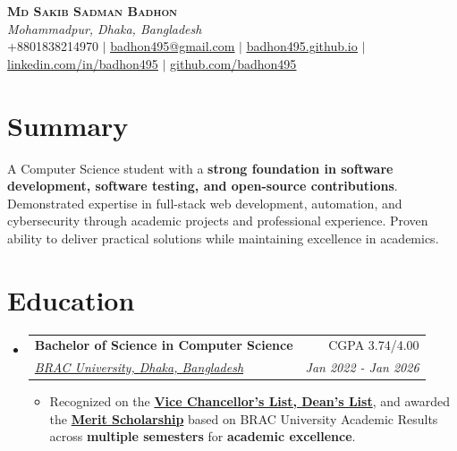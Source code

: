 \documentclass[letterpaper,11pt]{article}
\makeatletter
\newcommand{\resumeItem}[1]{
  \item\small{
    {#1 \vspace{-2pt}}
  }
}
\newcommand{\resumeSubheading}[4]{
  \vspace{-2pt}\item
    \begin{tabular*}{0.97\textwidth}[t]{l@{\extracolsep{\fill}}r}
      \textbf{#1} & #2 \\
      \textit{\small#3} & \textit{\small #4} \\
    \end{tabular*}\vspace{-7pt}
}
\newcommand{\resumeSubHeadingListStart}{\begin{itemize}[leftmargin=0.15in, label={}]}
\newcommand{\resumeSubHeadingListEnd}{\end{itemize}}
\newcommand{\resumeItemListStart}{\begin{itemize}}
\newcommand{\resumeItemListEnd}{\end{itemize}\vspace{-5pt}}
\makeatother
\begin{document}


\begin{center}
    \textbf{\Huge \scshape Md Sakib Sadman Badhon} \\ \vspace{1pt}
    \small \textit{Mohammadpur, Dhaka, Bangladesh} \\
    +8801838214970 $|$
    \href{mailto:badhon495@gmail.com}{\underline{badhon495@gmail.com}} $|$ 
    \href{https://badhon495.github.io/}{\underline{badhon495.github.io}} $|$ 
    \href{https://www.linkedin.com/in/badhon495/}{\underline{linkedin.com/in/badhon495}} $|$
    \href{https://github.com/badhon495}{\underline{github.com/badhon495}}
\end{center}

\section{Summary}
A Computer Science student with a \textbf{strong foundation in software development, software testing, and open-source contributions}. Demonstrated expertise in full-stack web development, automation, and cybersecurity through academic projects and professional experience. Proven ability to deliver practical solutions while maintaining excellence in academics.



\section{Education}
\resumeSubHeadingListStart
\resumeSubheading
{Bachelor of Science in Computer Science}{CGPA 3.74/4.00}
{\href{https://www.bracu.ac.bd/}{BRAC University, Dhaka, Bangladesh}} {Jan 2022 - Jan 2026}
\resumeItemListStart
\resumeItem{Recognized on the \href{https://www.bracu.ac.bd/academics/policies-and-procedures/academic-standings-and-honors}{\textbf{Vice Chancellor's List, Dean's List}}, and awarded the \href{https://www.bracu.ac.bd/admissions/international-applicants/scholarship-financial-aid}{\textbf{Merit Scholarship}} based on BRAC University Academic Results across \textbf{multiple semesters} for \textbf{academic excellence}.}
\resumeItemListEnd
\resumeSubHeadingListEnd
\end{document}
